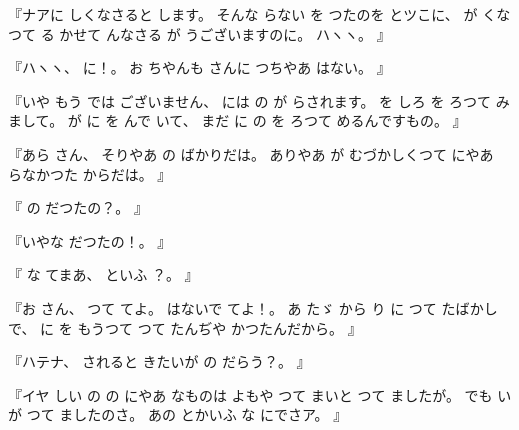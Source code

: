 %
『ナアに
しくなさると
します。
%
そんな
らない
を
つたのを
とツこに、
%
が
くなつて
る
かせて
んなさる
が
うございますのに。
%
ハヽヽ。
』

%
『ハヽヽ、
%
に！。%
%
お
ちやんも
さんに
つちやあ
はない。
』

%
『いや
もう
では
ございません、
%
には
の
が
らされます。
%
を
しろ
を
ろつて
みまして。
%
が
に
を
んで
いて、
%
まだ
に
の
を
ろつて
めるんですもの。
』

%
『あら
さん、
%
そりやあ
の
ばかりだは。
%
ありやあ
が
むづかしくつて
にやあ
らなかつた
からだは。
』

%
『
の
だつたの？。
』

%
『いやな
だつたの！。
』

%
『
な
てまあ、
%
といふ
？。
』

%
『お
さん、
%
つて
てよ。
%
はないで
てよ！。
あ
たゞ%
から
り
に
つて
たばかしで、
%
に
を
もうつて
つて
たんぢや
かつたんだから。
』

%
『ハテナ、
%
されると
きたいが
の
だらう？。
』

%
『イヤ
しい
の
の
にやあ
なものは
よもや
つて
まいと
つて
ましたが。
%
でも
い
が
つて
ましたのさ。
%
あの
とかいふ
な
にでさア。
』
